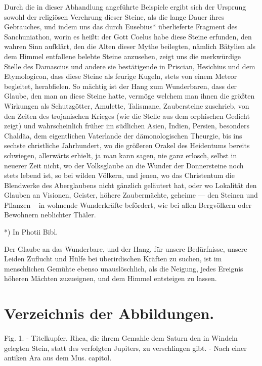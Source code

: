 \documentclass[a4paper, 11pt, oneside, polutonikogreek, german]{article}
\begin{document}
Durch die in dieser Abhandlung angeführte Beispiele ergibt sich der Ursprung sowohl der religiösen Verehrung dieser Steine, als die lange Dauer ihres Gebrauches, und indem uns das durch Eusebius* überlieferte Fragment des Sanchuniathon, worin es heißt: der Gott Coelus habe diese Steine erfunden, den wahren Sinn aufklärt, den die Alten dieser Mythe beilegten, nämlich Bätylien als dem Himmel entfallene belebte Steine anzusehen, zeigt uns die merkwürdige Stelle des Damascius und andere sie bestätigende in Priscian, Hesichius und dem Etymologicon, dass diese Steine als feurige Kugeln, stets von einem Meteor begleitet, herabfielen. So mächtig ist der Hang zum Wunderbaren, dass der Glaube, den man an diese Steine hatte, vermöge welchem man ihnen die größten Wirkungen als Schutzgötter, Amulette, Talismane, Zaubersteine zuschrieb, von den Zeiten des trojanischen Krieges (wie die Stelle aus dem orphischen Gedicht zeigt) und wahrscheinlich früher im südlichen Asien, Indien, Persien, besonders Chaldäa, dem eigentlichen Vaterlande der dämonologischen Theurgie, bis ins sechste christliche Jahrhundert, wo die größeren Orakel des Heidentums bereits schwiegen, allerwärts erhielt, ja man kann sagen, nie ganz erlosch, selbst in neuerer Zeit nicht, wo der Volksglaube an die Wunder der Donnersteine noch stets lebend ist, so bei wilden Völkern, und jenen, wo das Christentum die Blendwerke des Aberglaubens nicht gänzlich geläutert hat, oder wo Lokalität den Glauben an Visionen, Geister, höhere Zaubermächte, geheime --- den Steinen und Pflanzen -- in wohnende Wunderkräfte befördert, wie bei allen Bergvölkern oder Bewohnern neblichter Thäler.

*) In Photii Bibl.

Der Glaube an das Wunderbare, und der Hang, für unsere Bedürfnisse, unsere Leiden Zuflucht und Hülfe bei überirdischen Kräften zu suchen, ist im menschlichen Gemühte ebenso unauslöschlich, als die Neigung, jedes Ereignis höheren Mächten zuzueignen, und dem Himmel entsteigen zu lassen.
\clearpage
\section*{Verzeichnis der Abbildungen.}
\paragraph{}
Fig. 1. - Titelkupfer. Rhea, die ihrem Gemahle dem Saturn den in Windeln gelegten Stein, statt des verfolgten Jupiters, zu verschlingen gibt. - Nach einer antiken Ara aus dem Mus. capitol.
\end{document}
